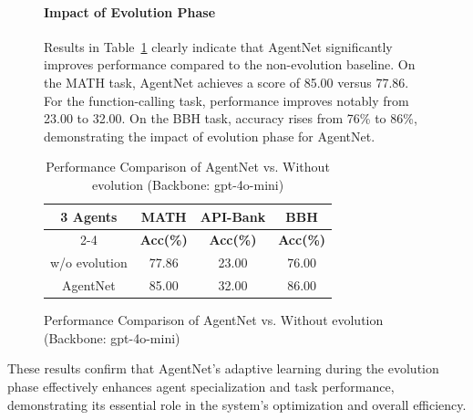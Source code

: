 \documentclass{article}
\begin{document}
\vspace{-0.5cm}


\begin{figure}[h!]
\centering
\begin{minipage}[t]{0.48\textwidth}
\vspace{+0.3cm}
\paragraph{Impact of Evolution Phase}
Results in Table~\ref{tab:warmup} clearly indicate that AgentNet significantly improves performance compared to the non-evolution baseline. On the MATH task, AgentNet achieves a score of 85.00 versus 77.86. For the function-calling task, performance improves notably from 23.00 to 32.00. On the BBH task, accuracy rises from 76\% to 86\%, demonstrating the impact of evolution phase for AgentNet.

\end{minipage}
\hfill
\begin{minipage}[t]{0.48\textwidth}
\begin{table}[H]
\centering
\vspace{-0.3cm}
\caption{Performance Comparison of AgentNet vs. Without evolution (Backbone: gpt-4o-mini)}
\vspace{+0.2cm}
\label{tab:warmup}
\renewcommand{\arraystretch}{1.1}
\begin{tabular}{c|c|c|c}
\hline
\rowcolor{lightblue} \textbf{3 Agents} & \textbf{MATH} & \textbf{API-Bank} & \textbf{BBH} \\
\cmidrule(lr){2-4}
{} & \textbf{Acc(\%)} & \textbf{Acc(\%)} & \textbf{Acc(\%)} \\
\hline
w/o evolution & 77.86 & 23.00 & 76.00 \\
AgentNet & 85.00 & 32.00 & 86.00 \\
\hline
\end{tabular}
\end{table}
\end{minipage}
\vspace{-0.1cm}
\end{figure}

These results confirm that AgentNet’s adaptive learning during the evolution phase effectively enhances agent specialization and task performance, demonstrating its essential role in the system’s optimization and overall efficiency.


\end{document}
